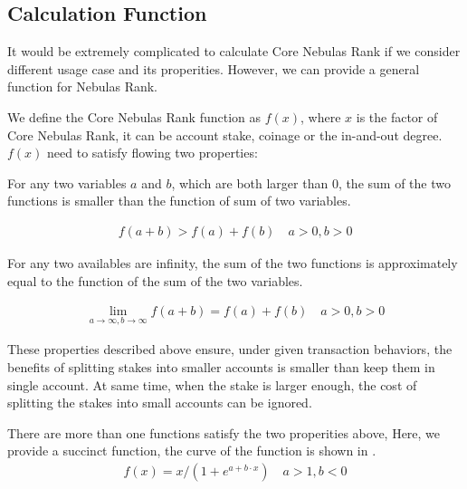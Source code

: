 \subsection{Calculation Function \label{sec:function}}
It would be extremely complicated to calculate Core Nebulas Rank if we consider different usage case and its properities. However, we can provide a general function for Nebulas Rank.

We define the Core Nebulas Rank function as \(f(x)\), where \(x\) is the factor of Core Nebulas Rank, it can be account stake, coinage or the in-and-out degree. $f(x)$ need to satisfy flowing two properties:

\begin{property}
\label{prop:one}
For any two variables $a$ and $b$, which are both larger than $0$, the sum of the two functions is smaller than the function of sum of two variables.
\end{property}

\begin{align}
f(a+b)>f(a)+f(b) \quad a>0,b>0
\end{align}

\begin{property}
\label{prop:two}
For any two availables are infinity, the sum of the two functions is approximately equal to the function of the sum of the two variables.
\end{property}

\begin{align}
\lim\limits_{a \to \infty, b\to \infty} f(a+b) = f(a) + f(b)\quad a>0, b>0
\end{align}

These properties described above ensure, under given transaction behaviors, the benefits of splitting stakes into smaller accounts is smaller than keep them in single account. At same time, when the stake is larger enough, the cost of splitting the stakes into small accounts can be ignored. 

There are more than one functions satisfy the two properities above, Here, we provide a succinct function, the curve of the function is shown in .
\begin{align}
f(x) = x/(1 + e^{a + b\cdot x}) \quad a>1,b<0
\end{align}

